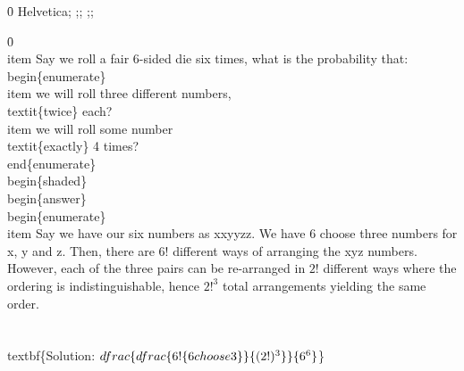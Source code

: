 {\ansi{}
{\fonttbl\f0\fswiss{} Helvetica;}
{;;}
{\*\expandedcolortbl;;}
\pard{}\pardirnatural{}

\f0     \\item Say we roll a fair 6-sided die six times, what is the probability that:\
    \\begin\{enumerate\}\
        \\item we will roll three different numbers, \\textit\{twice\} each?\
        \\item we will roll some number \\textit\{exactly\} 4 times?\
    \\end\{enumerate\}\
\
    \
    \\begin\{shaded\}\
    \\begin\{answer\}\
    \\begin\{enumerate\}\
        \\item Say we have our six numbers as xxyyzz. We have 6 choose three numbers for x, y and z. Then, there are 6! different ways of arranging the xyz numbers. However, each of the three pairs can be re-arranged in $2!$ different ways where the ordering is indistinguishable, hence $2!^3$ total arrangements yielding the same order.  \\\\ \\textbf\{Solution: $\\dfrac\{\\dfrac\{6! \{6 \\choose 3\}\}\{(2!)^3\}\}\{6^6\}$\}\
}

